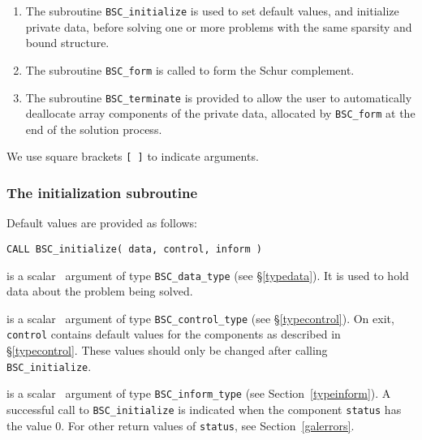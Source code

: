 \documentclass{galahad}
\newcommand{\packagename}{BSC}
\begin{document}
\begin{enumerate}
\item The subroutine 
      {\tt \packagename\_initialize} 
      is used to set default values, and initialize private data, 
      before solving one or more problems with the
      same sparsity and bound structure.
\item The subroutine 
      {\tt \packagename\_form} 
      is called to form the Schur complement.
\item The subroutine 
      {\tt \packagename\_terminate} 
      is provided to allow the user to automatically deallocate array 
       components of the private data, allocated by 
       {\tt \packagename\_form} 
       at the end of the solution process. 
\end{enumerate}
We use square brackets {\tt [ ]} to indicate \optional arguments.


\subsubsection{The initialization subroutine}\label{subinit}
 Default values are provided as follows:
\vspace*{1mm}

\hspace{8mm}
{\tt CALL \packagename\_initialize( data, control, inform )}

\vspace*{-3mm}
\begin{description}

 is a scalar \intentinout\ argument of type 
{\tt \packagename\_data\_type}
(see \S\ref{typedata}). It is used to hold data about the problem being 
solved. 

 is a scalar \intentout\ argument of type 
{\tt \packagename\_control\_type}
(see \S\ref{typecontrol}). 
On exit, {\tt control} contains default values for the components as
described in \S\ref{typecontrol}.
These values should only be changed after calling 
{\tt \packagename\_initialize}.

 is a scalar \intentout\ argument of type 
{\tt \packagename\_inform\_type}
(see Section~\ref{typeinform}). A successful call to
{\tt \packagename\_initialize}
is indicated when the  component {\tt status} has the value 0. 
For other return values of {\tt status}, see Section~\ref{galerrors}.

\end{description}
\end{document}
